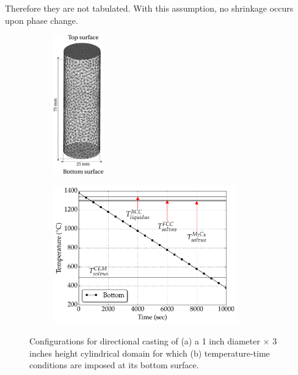 Therefore they are not tabulated. With this assumption, no shrinkage occurs upon phase change.
%
\begin{figure}[htbp]
\centering
  \begin{subfigure}[t]{0.3\textwidth}
    \centering
	\includegraphics[height=6cm]{Chapter3/Graphics/multicomponent/geo_bc/Cylinder_nocolor_annotate.pdf}
	\caption{}
    \label{fig:mutlicomponent_geo}
  \end{subfigure}
   \hspace{1mm}%
   \begin{subfigure}[t]{0.5\textwidth}
    \centering
	\includegraphics[height=6cm]{Chapter3/Graphics/multicomponent/geo_bc/BC.pdf}
	\caption{}
    \label{fig:mutlicomponent_bc}
  \end{subfigure}
\caption{Configurations for directional casting of (a) a 1 inch diameter $\times$ 3 inches height cylindrical domain for which
(b) temperature-time conditions are imposed at its bottom surface.} 
\label{fig:mutlicomponent_geobc}
\end{figure}
%
%
